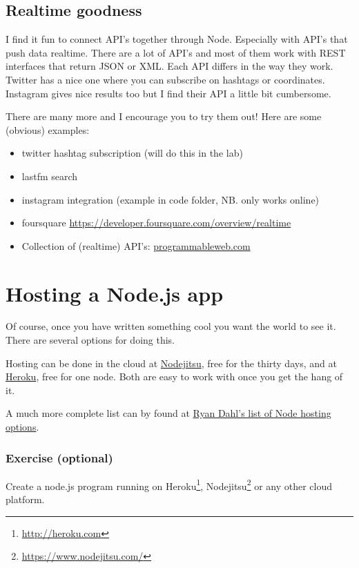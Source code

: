 \documentclass[a4paper]{report}
\begin{document}
\subsection*{Realtime goodness} 
I find it fun to connect API's together through Node. Especially with API's that push data realtime. There are a lot of API's and most of them work with REST interfaces that return JSON or XML. Each API differs in the way they work. Twitter has a nice one where you can subscribe on hashtags or coordinates. Instagram gives nice results too but I find their API a little bit cumbersome. 
 
There are many more and I encourage you to try them out! Here are some (obvious) examples: 
 
\begin{itemize} 
	\item twitter hashtag subscription (will do this in the lab) 
	\item lastfm search 
	\item instagram integration (example in code folder, NB. only works online) 
	\item foursquare \href{https://developer.foursquare.com/overview/realtime}{https://developer.foursquare.com/overview/realtime} 
	\item Collection of (realtime) API's: \href{http://www.programmableweb.com/}{programmableweb.com} 
\end{itemize} 
 
\section*{Hosting a Node.js app} 
Of course, once you have written something cool you want the world to see it. There are several options for doing this. 
 
Hosting can be done in the cloud at \href{https://www.nodejitsu.com/}{Nodejitsu}, free for the thirty days, and at \href{https://www.heroku.com/}{Heroku}, free for one node. Both are easy to work with once you get the hang of it. 
 
A much more complete list can by found at \href{https://github.com/joyent/node/wiki/Node-Hosting}{Ryan Dahl's list of Node hosting options}. 
 
\subsubsection*{Exercise (optional)} 
Create a node.js program running on Heroku\footnote{\url{http://heroku.com}}, Nodejitsu\footnote{\url{https://www.nodejitsu.com/}} or any other cloud platform. 
 
\end{document}
